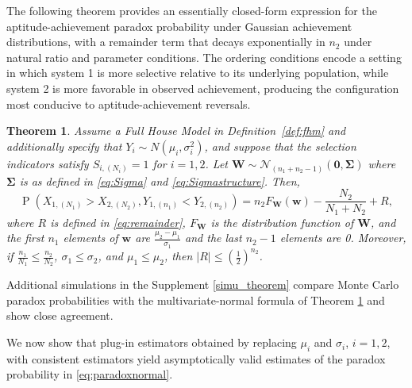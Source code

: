 \documentclass[12pt]{article}
\DeclareMathOperator*{\Prob}{P}
\newtheorem{theorem}{Theorem}[section]
\begin{document}
The following theorem provides an essentially closed-form expression for the aptitude-achievement paradox probability under Gaussian achievement distributions, with a remainder term that decays exponentially in $n_2$ under natural ratio and parameter conditions. The ordering conditions encode a setting in which system 1 is more selective relative to its underlying population, while system 2 is more favorable in observed achievement, producing the configuration most conducive to aptitude-achievement reversals.

\begin{theorem} 
\label{theorem:normalgeneral}
Assume a Full House Model in Definition~\ref{def:fhm} and additionally specify that $Y_i \sim N(\mu_i,\sigma_i^2)$, and suppose that the selection indicators satisfy $S_{i,(N_i)} = 1$ for $i = 1,2$. Let $\mathbf{W} \sim \mathcal{N}_{(n_1 + n_2 - 1)}(\boldsymbol{0}, \boldsymbol{\Sigma})$ where $\boldsymbol{\Sigma}$ is as defined in \eqref{eq:Sigma} and \eqref{eq:Sigmastructure}. Then,  
\begin{equation} \label{eq:paradoxnormal}
\Prob\left(X_{1,(N_1)} > X_{2,(N_2)}, Y_{1,(n_1)} < Y_{2,(n_2)}\right) = n_2F_{\mathbf{W}}(\mathbf{w}) - \frac{N_2}{N_1 + N_2} + R,	
\end{equation}
where $R$ is defined in \eqref{eq:remainder}, $F_{\mathbf{W}}$ is the distribution function of $\mathbf{W}$, and the first $n_1$ elements of $\mathbf{w}$ are $\frac{\mu_2 - \mu_1}{\sigma_1}$ and the last $n_2-1$ elements are 0. Moreover, if $\frac{n_1}{N_1} \leq \frac{n_2}{N_2}$, $\sigma_1 \leq \sigma_2$, and $\mu_1 \leq \mu_2$, then $|R| \leq \left(\frac{1}{2}\right)^{n_2}$.
\end{theorem}

Additional simulations in the Supplement \ref{simu_theorem} compare Monte Carlo paradox probabilities with the multivariate-normal formula of Theorem \ref{theorem:normalgeneral} and show close agreement.

We now show that plug-in estimators obtained by replacing $\mu_i$ and $\sigma_i$, $i=1,2$, with consistent estimators yield asymptotically valid estimates of the paradox probability in \eqref{eq:paradoxnormal}.
\end{document}
